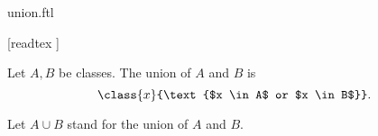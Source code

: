 \documentclass{stex}
\begin{document}
\begin{smodule}{union.ftl}

  \begin{forthel}

    [readtex ]
  \end{forthel}

  \begin{forthel}
    \begin{definition}
      Let $A, B$ be classes.
      The union of $A$ and $B$ is
      \[\class{x}{\text{$x \in A$ or $x \in B$}}.\]
    \end{definition}

    Let $A \cup B$ stand for the union of $A$ and $B$.
  \end{forthel}
\end{smodule}
\end{document}
